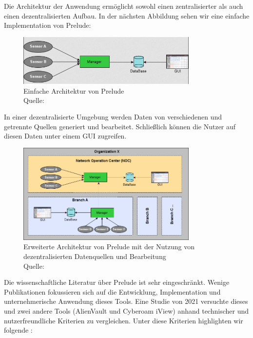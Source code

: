 Die Architektur der Anwendung ermöglicht sowohl einen zentralisierter als auch einen dezentralisierten Aufbau. In der nächsten Abbildung sehen wir eine einfache Implementation von Prelude: 

\begin{figure}[H]
   \centering
   \includegraphics[width=0.8\textwidth]{assets/2_p4.png}
   \caption{Einfache Architektur von Prelude \\Quelle: \citep{Prelude_MU} }
   \centering
\end{figure}

In einer dezentralisierte Umgebung werden Daten von verschiedenen und getrennte Quellen generiert und bearbeitet. Schließlich können die Nutzer auf diesen Daten unter einem \gls{GUI} zugreifen.

\begin{figure}[H]
   \centering
   \includegraphics[width=0.8\textwidth]{assets/2_p5.png}
   \caption{Erweiterte Architektur von Prelude mit der Nutzung von dezentralisierten Datenquellen und Bearbeitung \\Quelle: \citep{Prelude_MU} }
   \centering
\end{figure}

Die wissenschaftliche Literatur über Prelude ist sehr eingeschränkt. Wenige Publikationen fokussieren sich auf die Entwicklung, Implementation und unternehmerische Anwendung dieses Tools. Eine Studie von 2021 versuchte dieses und zwei andere Tools (AlienVault und Cyberoam iView) anhand technischer und nutzerfreundliche Kriterien zu vergleichen. Unter diese Kriterien highlighten wir folgende \citep{Grammatikis_Prelude}:

